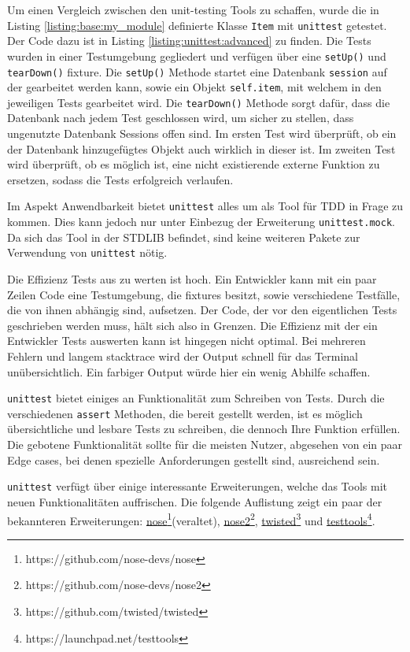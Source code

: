 Um einen Vergleich zwischen den unit-testing Tools zu schaffen, wurde die in
Listing \ref{listing:base:my_module} definierte Klasse \lstinline{Item} mit
\lstinline{unittest} getestet. Der Code dazu ist in Listing
\ref{listing:unittest:advanced} zu finden.
Die Tests wurden in einer Testumgebung gegliedert und verfügen über eine
\lstinline{setUp()} und \lstinline{tearDown()} \Gls{fixture}. Die
\lstinline{setUp()} Methode startet eine Datenbank \lstinline{session} auf der
gearbeitet werden kann, sowie ein Objekt \lstinline{self.item}, mit welchem in
den jeweiligen Tests gearbeitet wird. Die \lstinline{tearDown()} Methode
sorgt dafür, dass die Datenbank nach jedem Test geschlossen wird, um sicher zu 
stellen, dass ungenutzte Datenbank Sessions offen sind. Im ersten Test wird 
überprüft, ob ein der Datenbank hinzugefügtes Objekt auch wirklich in dieser 
ist. Im zweiten Test wird überprüft, ob es möglich ist, eine nicht existierende 
externe Funktion zu ersetzen, sodass die Tests erfolgreich verlaufen.
\newline

Im Aspekt Anwendbarkeit bietet \lstinline|unittest| alles um als Tool für TDD in
Frage zu kommen. Dies kann jedoch nur unter Einbezug der Erweiterung
\lstinline|unittest.mock|. Da sich das Tool in der STDLIB befindet, sind keine
weiteren Pakete zur Verwendung von \lstinline{unittest} nötig.

Die Effizienz Tests aus zu werten ist hoch. Ein Entwickler kann mit ein paar
Zeilen Code eine Testumgebung, die \Glspl{fixture} besitzt, sowie verschiedene 
Testfälle, die von ihnen abhängig sind, aufsetzen. Der Code, der vor den 
eigentlichen Tests geschrieben werden muss, hält sich also in Grenzen. Die
Effizienz mit der ein Entwickler Tests auswerten kann ist hingegen nicht 
optimal. Bei mehreren Fehlern und langem \gls{stacktrace} wird der Output 
schnell für das Terminal unübersichtlich. Ein farbiger Output 
würde hier 
ein wenig Abhilfe schaffen.

\lstinline{unittest} bietet einiges an Funktionalität zum Schreiben von Tests.
Durch die verschiedenen \lstinline{assert} Methoden, die bereit gestellt werden,
ist es möglich übersichtliche und lesbare Tests zu schreiben, die dennoch Ihre
Funktion erfüllen. Die gebotene Funktionalität sollte für die meisten Nutzer, 
abgesehen von ein paar Edge cases, bei denen spezielle Anforderungen  gestellt 
sind, ausreichend sein.

\lstinline{unittest} verfügt über einige interessante Erweiterungen, welche das 
Tools mit neuen Funktionalitäten auffrischen. Die folgende Auflistung zeigt ein 
paar der bekannteren Erweiterungen: 
\href{https://github.com/nose-devs/nose}{nose}\footnote{https://github.com/nose-devs/nose}(veraltet),
\href{https://github.com/nose-devs/nose2}{nose2}\footnote{https://github.com/nose-devs/nose2},
\href{https://github.com/twisted/twisted}{twisted}\footnote{https://github.com/twisted/twisted}
und
\href{https://launchpad.net/testtools}{testtools}\footnote{https://launchpad.net/testtools}.